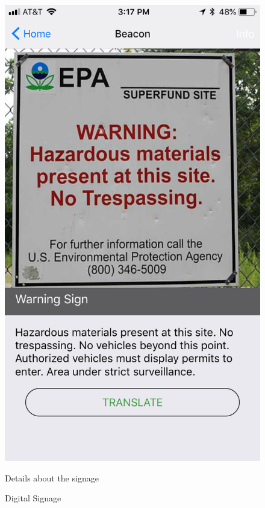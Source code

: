 \documentclass[12pt]{article}
\begin{document}
 \begin{figure} [H]
\centering
\begin{minipage}{.5\textwidth}
  \centering
  \includegraphics[width=0.9\linewidth]{media/beacon.PNG}
  \caption{Digital Signage}{Details about the signage}
  \label{fig:beaconDetails}
\end{minipage}%
\begin{minipage}{.5\textwidth}
  \centering

\end{minipage}
\end{figure}
\end{document}
